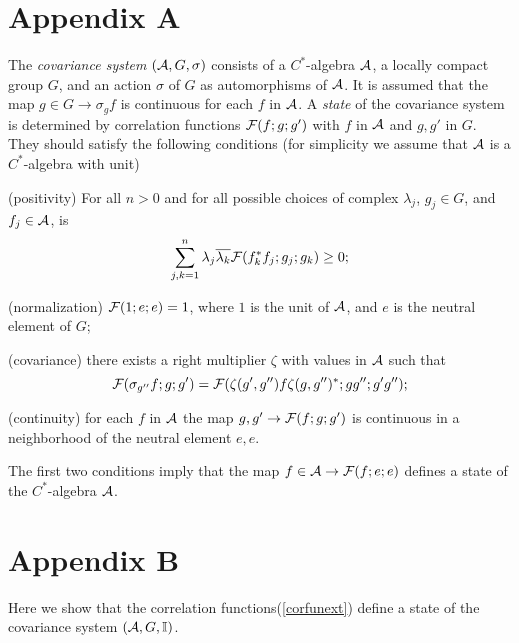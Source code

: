 \documentclass[12pt,a4paper]{article}
\def\Io{{\mathbb I}}
\begin{document}
\section*{Appendix A}

The {\sl covariance system} $({\cal A},G,\sigma)$ consists of a $C^*$-algebra
$\cal A$, a locally compact group $G$, and an action $\sigma$ of $G$
as automorphisms of $\cal A$. It is assumed that the map
$g\in G\rightarrow \sigma_g f$ is continuous for each $f$ in $\cal A$.
A {\sl state} of the covariance system is determined by correlation
functions ${\cal F}(f;g;g')$ with $f$ in $\cal A$ and $g,g'$ in $G$.
They should satisfy the following conditions (for simplicity
we assume that $\cal A$ is a $C^*$-algebra with unit)
\begin{description}
\item {}(positivity) For all $n>0$ and for all possible choices of complex $\lambda_j$,
$g_j\in G$, and $f_j\in{\cal A}$, is
\begin{equation}
\sum_{j,k=1}^n\lambda_j\overline{\lambda_k}{\cal F}(f_k^*f_j;g_j;g_k)\ge 0;
\end{equation}
\item {}(normalization) ${\cal F}(1;e;e)=1$, where $1$ is the unit of $\cal A$,
and $e$ is the neutral element of $G$;
\item {}(covariance) there exists a right multiplier $\zeta$ with values in $\cal A$
such that
\begin{equation}
{\cal F}(\sigma_{g''}f;g;g')={\cal F}(\zeta(g',g'')f\zeta(g,g'')^*;gg'';g'g'');
\label{covdef}
\end{equation}
\item {}(continuity) for each $f$ in $\cal A$ the map $g,g'\rightarrow {\cal F}(f;g;g')$ is
continuous in a neighborhood of the neutral element $e,e$.
\end{description}

The first two conditions imply that the map $f\in{\cal A}\rightarrow {\cal F}(f;e;e)$
defines a state of the $C^*$-algebra $\cal A$.

\section*{Appendix B}

Here we show that the correlation functions(\ref{corfunext})
define a state of the covariance system $({\cal A},G,\Io)$.
\end{document}

